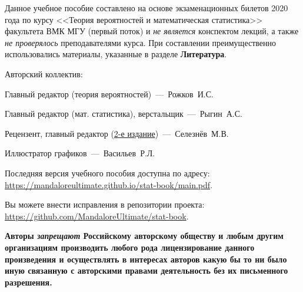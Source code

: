 Данное учебное пособие составлено на основе экзаменационных билетов 2020 года по курсу <<Теория вероятностей и математическая статистика>> факультета ВМК МГУ (первый поток) и \textit{не является} конспектом лекций, а также \textit{не проверялось} преподавателями курса. При составлении преимущественно использовались материалы, указанные в разделе \textbf{Литература}.

\vspace{5mm}

Авторский коллектив:
\begin{compactlist}
	\item Главный редактор (теория вероятностей)~---~Рожков~И.С.
	\item Главный редактор (мат. статистика), верстальщик~---~Рыгин~А.С.
	\item Рецензент, главный редактор (\href{https://github.com/Dont-Care-Didnt-Ask/Stat-book}{2-е издание})~---~Селезнёв~М.В.
	\item Иллюстратор графиков~---~Васильев~Р.Л.
\end{compactlist}

\vspace{5mm}

Последняя версия учебного пособия доступна по адресу: \\ \url{https://mandaloreultimate.github.io/stat-book/main.pdf}.

Вы можете внести исправления в репозитории проекта: \\ \url{https://github.com/MandaloreUltimate/stat-book}.

\vspace{1cm}

\textbf{Авторы \textit{запрещают} Российскому авторскому обществу и любым другим организациям производить любого рода лицензирование данного произведения и осуществлять в интересах авторов какую бы то ни было иную связанную с авторскими правами деятельность без их письменного разрешения.}